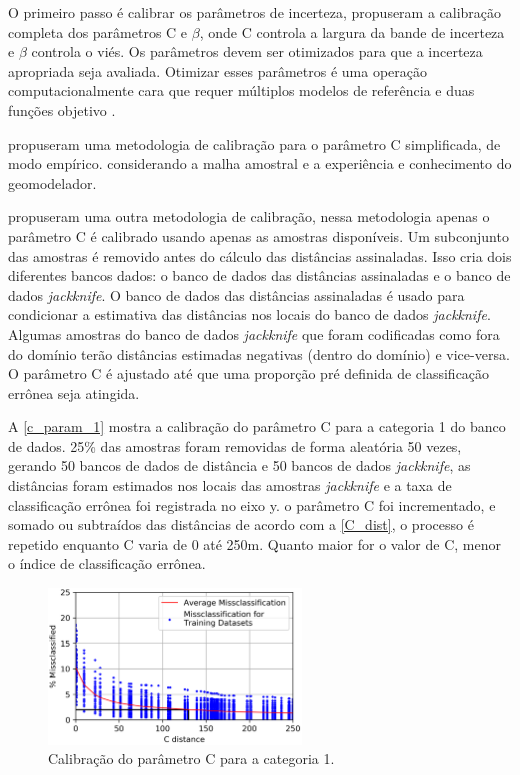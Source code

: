 O primeiro passo é calibrar os parâmetros de incerteza,  propuseram a calibração completa dos parâmetros C e $\beta$, onde C controla a largura da bande de incerteza e $\beta$ controla o viés. Os parâmetros devem ser otimizados para que a incerteza apropriada seja avaliada. Otimizar esses parâmetros é uma operação computacionalmente cara que requer múltiplos modelos de referência e duas funções objetivo \cite{wilde2012kriging}.

 propuseram uma metodologia de calibração para o parâmetro C simplificada, de modo empírico. considerando a malha amostral e a experiência e conhecimento do geomodelador.

 propuseram uma outra metodologia de calibração, nessa metodologia apenas o parâmetro C é calibrado usando apenas as amostras disponíveis. Um subconjunto das amostras é removido antes do cálculo das distâncias assinaladas. Isso cria dois diferentes bancos dados: o banco de dados das distâncias assinaladas e o banco de dados \textit{jackknife}. O banco de dados das distâncias assinaladas é usado para condicionar a estimativa das distâncias nos locais do banco de dados \textit{jackknife}. Algumas amostras do banco de dados \textit{jackknife} que foram codificadas como fora do domínio terão distâncias estimadas negativas (dentro do domínio) e vice-versa. O parâmetro C é ajustado até que uma proporção pré definida de classificação errônea seja atingida.

A \autoref{c_param_1} mostra a calibração do parâmetro C para a categoria 1 do banco de dados. 25\% das amostras foram removidas de forma aleatória 50 vezes, gerando 50 bancos de dados de distância e 50 bancos de dados \textit{jackknife}, as distâncias foram estimados nos locais das amostras \textit{jackknife} e a taxa de classificação errônea foi registrada no eixo y. o parâmetro C foi incrementado, e somado ou subtraídos das distâncias de acordo com a \autoref{C_dist}, o processo é repetido enquanto C varia de 0 até 250m. Quanto maior for o valor de C, menor o índice de classificação errônea.

\begin{figure}[!ht]
	\caption{\label{c_param_1}Calibração do parâmetro C para a categoria 1.}
	\begin{center}
		\includegraphics[width=0.6\textwidth]{capitulo_2/uncert_1.png}
	\end{center}
\end{figure}

